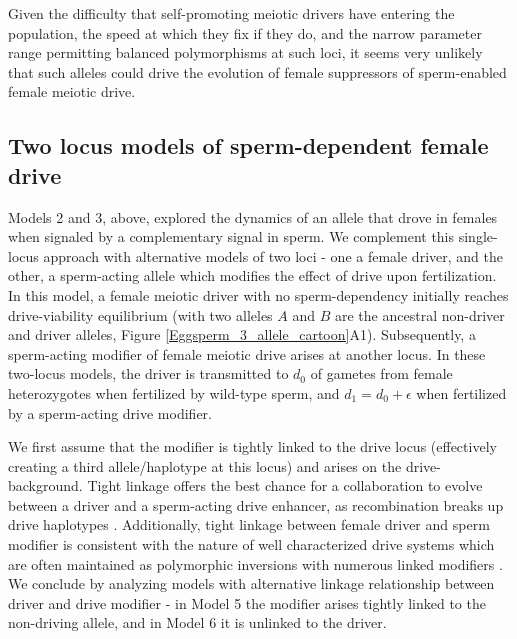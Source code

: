 \documentclass[12pt,letterpaper]{article}
\begin{document}
Given the difficulty that self-promoting meiotic drivers have entering the population, the speed at
which they fix if they do, and the narrow parameter range permitting balanced polymorphisms at such loci,  
it seems very unlikely that such alleles could drive the evolution of female suppressors of sperm-enabled
female meiotic drive. \newline 




\subsection*{Two locus models of sperm-dependent female drive}



Models 2 and 3, above, explored the dynamics of an allele that drove in females when signaled by a complementary signal in sperm.   
We complement this single-locus approach %
	with alternative models of two loci - one a female driver, 
	and the other, a sperm-acting allele which modifies the effect of drive upon fertilization. 
In this model, a female meiotic driver with no sperm-dependency 
	initially reaches drive-viability equilibrium (with two alleles
	$A$ and $B$ are the ancestral non-driver and driver alleles, Figure \ref{Eggsperm_3_allele_cartoon}A1). 
Subsequently, a sperm-acting modifier of female meiotic drive arises at another locus.  
In these two-locus models, the driver is transmitted to $d_0$ of gametes from female heterozygotes when fertilized by wild-type sperm, and $d_1=d_0+\epsilon$ when fertilized by a sperm-acting drive modifier. \newline 

We first assume that the modifier is tightly
        linked to the drive locus (effectively creating a third
        allele/haplotype at this locus) and arises on the drive-background. 
Tight linkage offers the best
        chance for a collaboration to evolve between a driver and
       a sperm-acting drive  enhancer, as recombination breaks up drive haplotypes \citep{Thomson1974,Charlesworth1978,Haig1991}. 
Additionally, tight linkage between female driver and sperm modifier is consistent with the nature of well characterized drive systems which are often maintained as polymorphic inversions with numerous linked modifiers \cite{Burt2006}. 
We conclude by analyzing models with alternative linkage relationship between driver and drive modifier - 
	in Model 5 the modifier arises tightly linked to the non-driving allele, 
	and in Model 6 it is unlinked to the driver. \newline 
\end{document}

